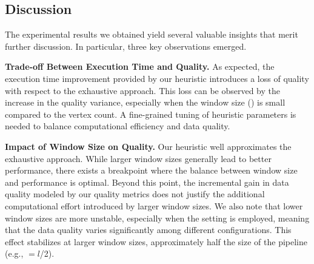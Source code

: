 {\color{OurColor}
\subsection{Discussion}
The experimental results we obtained yield several valuable insights that merit further discussion. In particular, three key observations  emerged.

\vspace{0.5em}

    \noindent\textbf{Trade-off Between Execution Time and Quality.} As expected, the execution time improvement provided by our heuristic introduces a loss of quality with respect to the exhaustive approach. This loss can be observed by the increase in the quality variance, especially when the window size (\windowsize) is small compared to the vertex count. A fine-grained tuning of heuristic parameters is needed to balance computational efficiency and data quality.

\vspace{0.5em}

    \noindent\textbf{Impact of Window Size on Quality.} Our heuristic well approximates the exhaustive approach. While larger window sizes generally lead to better performance, there exists a breakpoint where the balance between window size and performance is optimal. Beyond this point, the incremental gain in data quality modeled by our quality metrics does not justify the additional computational effort introduced by larger window sizes. We also note that lower window sizes are more unstable, especially when the  \wide setting is employed, meaning that the data quality varies significantly among different configurations. This effect stabilizes at larger window sizes, approximately half the size of the pipeline (e.g., \windowsize$=$$l$/2).

}
